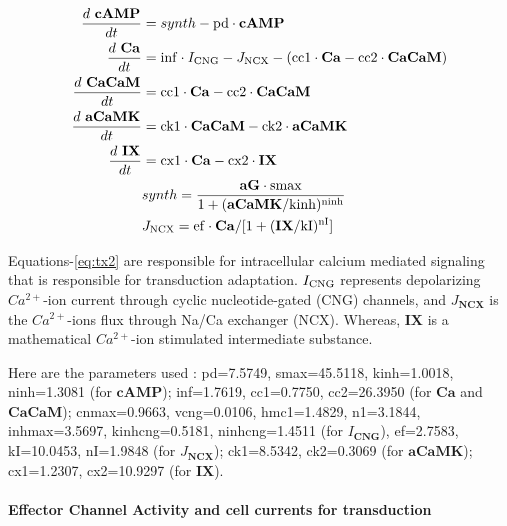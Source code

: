 \documentclass[
]{article}
\begin{document}
\begin{equation}\label{eq:tx2}
\begin{split}
\frac{d\ \mathbf{cAMP}}{dt} &= synth - {\rm pd} \cdot \mathbf{cAMP} \\
\frac{d\ \mathbf{Ca}}{dt} &= {\rm inf}\cdot I_{\rm CNG} - J_{\rm NCX} - ({\rm cc1} \cdot \mathbf{Ca} - {\rm cc2} \cdot \mathbf{CaCaM}) \\
\frac{d\ \mathbf{CaCaM}}{dt} &= {\rm cc1} \cdot \mathbf{Ca} - {\rm cc2} \cdot \mathbf{CaCaM} \\
\frac{d\ \mathbf{aCaMK}}{dt} &= {\rm ck1} \cdot \mathbf{CaCaM} - {\rm ck2} \cdot \mathbf{aCaMK} \\
\frac{d\ \mathbf{IX}}{dt} &= {\rm cx1} \cdot \mathbf{Ca} - {\rm cx2} \cdot \mathbf{IX} \\
& synth = \frac{\mathbf{aG} \cdot {\rm smax}}{1 + (\mathbf{aCaMK} / {\rm kinh} )^{\rm ninh}} \\
& J_{\rm NCX} = {\rm ef}\cdot \mathbf{Ca}/[1+(\mathbf{IX}/{\rm kI})^{\rm nI}] \\
\end{split}
\end{equation}

Equations-\eqref{eq:tx2} are responsible for intracellular calcium mediated signaling that is responsible for transduction adaptation. \(I_{\rm CNG}\) represents depolarizing \(Ca^{2+}\)-ion current through cyclic nucleotide-gated (CNG) channels, and \(J_\mathbf{NCX}\) is the \(Ca^{2+}\)-ions flux through Na/Ca exchanger (NCX). Whereas, \(\mathbf{IX}\) is a mathematical \(Ca^{2+}\)-ion stimulated intermediate substance.

Here are the parameters used : pd=7.5749, smax=45.5118, kinh=1.0018, ninh=1.3081 (for \(\mathbf{cAMP}\)); inf=1.7619, cc1=0.7750, cc2=26.3950 (for \(\mathbf{Ca}\) and \(\mathbf{CaCaM}\)); cnmax=0.9663, vcng=0.0106, hmc1=1.4829, n1=3.1844, inhmax=3.5697, kinhcng=0.5181, ninhcng=1.4511 (for \(I_\mathbf{CNG}\)), ef=2.7583, kI=10.0453, nI=1.9848 (for \(J_\mathbf{NCX}\)); ck1=8.5342, ck2=0.3069 (for \(\mathbf{aCaMK}\)); cx1=1.2307, cx2=10.9297 (for \(\mathbf{IX}\)).

\hypertarget{effector-channel-activity-and-cell-currents-for-transduction}{%
\paragraph*{Effector Channel Activity and cell currents for transduction}\label{effector-channel-activity-and-cell-currents-for-transduction}}
\end{document}
